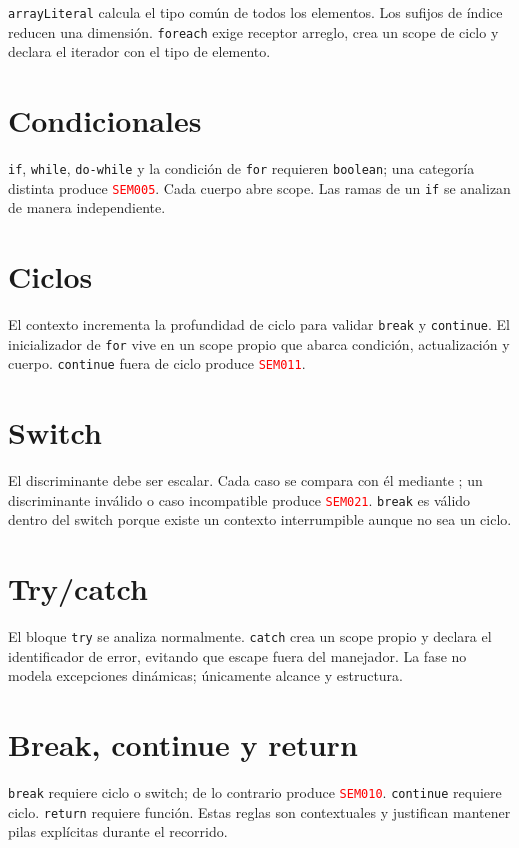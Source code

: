 \documentclass[11pt,letterpaper,oneside]{report}
\newcommand{\archivo}[1]{\path{#1}}
\newcommand{\codigo}[1]{\texttt{#1}}
\newcommand{\diag}[1]{\textcolor{red}{\texttt{#1}}}
\begin{document}
\codigo{arrayLiteral} calcula el tipo común de todos los elementos. Los sufijos de
índice reducen una dimensión. \codigo{foreach} exige receptor arreglo, crea un scope
de ciclo y declara el iterador con el tipo de elemento.

\section{Condicionales}

\codigo{if}, \codigo{while}, \codigo{do-while} y la condición de
\codigo{for} requieren \codigo{boolean}; una categoría distinta produce
\diag{SEM005}. Cada cuerpo abre scope. Las ramas de un \codigo{if} se analizan de
manera independiente.

\section{Ciclos}

El contexto incrementa la profundidad de ciclo para validar \codigo{break} y
\codigo{continue}. El inicializador de \codigo{for} vive en un scope propio que
abarca condición, actualización y cuerpo. \codigo{continue} fuera de ciclo produce
\diag{SEM011}.

\section{Switch}

El discriminante debe ser escalar. Cada caso se compara con él mediante
\archivo{isComparable}; un discriminante inválido o caso incompatible produce
\diag{SEM021}. \codigo{break} es válido dentro del switch porque existe un contexto
interrumpible aunque no sea un ciclo.

\section{Try/catch}

El bloque \codigo{try} se analiza normalmente. \codigo{catch} crea un scope propio y
declara el identificador de error, evitando que escape fuera del manejador. La fase
no modela excepciones dinámicas; únicamente alcance y estructura.

\section{Break, continue y return}

\codigo{break} requiere ciclo o switch; de lo contrario produce \diag{SEM010}.
\codigo{continue} requiere ciclo. \codigo{return} requiere función. Estas reglas son
contextuales y justifican mantener pilas explícitas durante el recorrido.
\end{document}
